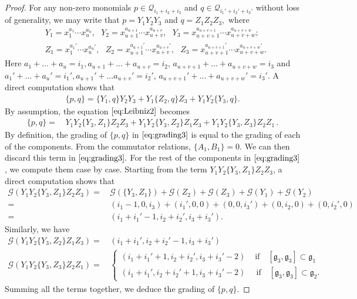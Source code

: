 \documentclass[10pt]{amsart}
\theoremstyle{definition}
\theoremstyle{corollary}
\theoremstyle{remark}
\theoremstyle{conclusion}
\begin{document}
 \begin{proof}
     For any non-zero monomials $p  \in \mathcal{Q}_{i_1 + i_2  + i_3}$ and $q \in \mathcal{Q}_{i_1' + i_2' + i_3'}$ without loss of generality, we may write that $p = Y_1Y_2Y_3$ and $q = Z_1Z_2Z_3,$ where  
        \begin{align*}
         &  Y_1 = x_1^{a_1} \cdots x_u^{a_u},    \text{ } Y_2 = x_{u+1}^{a_{u+1}} \cdots x_{u+v}^{a_{u+v}}, \text{ } Y_3 =  x_{u+v+1}^{a_{u+v+1}} \cdots x_{u+v+w}^{a_{u+v+w}} ; \\
      & Z_1 = x_1^{a_1'} \cdots x_u^{a_u'} ,\text{ } Z_2 = x_{u+1}^{a_{u+1}'} \cdots x_{u+v}^{a_{u+v}'} , \text{ }  Z_3 =  x_{u+v+1}^{a_{u+v+1}'} \cdots x_{u+v+w}^{a_{u+v+w}'}.
    \end{align*} 
    Here $a_1 + \ldots + a_u = i_1, a_{u+1} + \ldots + a_{u+v} = i_2$, $a_{u+v+1} + \ldots + a_{u+v+w} = i_3$ and $a_1' + \ldots + a_u' = i_1', a_{u+1}' + \ldots a_{u+v}' = i_2'$, $a_{u+v+1}' + \ldots + a_{u+v+w}' = i_3'.$ A direct computation shows that 
    \begin{align}
     \{p,q\} = \{Y_1,q\}Y_2Y_3 + Y_1\{Z_2,q\}Z_3 + Y_1 Y_2 \{Y_3,q\}. \label{eq:Leibniz2}
 \end{align}    
 By assumption, the equation $\eqref{eq:Leibniz2}$ becomes 
 \begin{align}
     \{p,q\}    =    & \,    Y_1Y_2 \{Y_3,Z_1\}Z_2 Z_3 +  Y_1Y_2 \{Y_3,Z_2\}Z_1 Z_3 +  Y_1Y_2 \{Y_3,Z_3\}Z_2 Z_1 \, . \label{eq:grading3}
 \end{align}   
 By definition, the grading of $\{p,q\}$ in $\eqref{eq:grading3}$ is equal to the grading of each of the components. From the commutator relations, $\{A_1,B_1\} = 0$. We can then discard this term in $\eqref{eq:grading3}.$ For the rest of the components in $\eqref{eq:grading3}$, we  compute them case by case. Starting from the term  $  Y_1Y_2 \{Y_3,Z_1\}Z_2 Z_3$, a direct computation shows that 
 \begin{align*}
     \mathcal{G} \left(  Y_1Y_2 \{Y_3,Z_1\}Z_2 Z_3\right) = & \, \mathcal{G} \left(\{Y_3,Z_1\}\right) + \mathcal{G} (Z_2) + \mathcal{G} (Z_3) + \mathcal{G} (Y_1) +\mathcal{G} (Y_2)  \\
     = & \, (i_1-1,0,i_3) + ( i_1', 0,0 ) + (0,0,i_3')+ (0,i_2,0)+ (0,i_2',0 ) \\
     = & \, (i_1 +i_1'-1,i_2 +i_2',i_3+i_3') .
 \end{align*} Similarly, we have \begin{align*}
      \mathcal{G} \left(Y_1Y_2 \{Y_3,Z_2\}Z_1 Z_3 \right) = & \, (i_1+i_1',i_2+i_2'-1,i_3+i_3')\\
       \mathcal{G} \left(Y_1Y_2 \{Y_3,Z_3\}Z_2 Z_1\right) = & \, \left\{\begin{matrix}
           ( i_1+i_1'+1,i_2+i_2',i_3+i_3'-2) &  \text{ if } \text{ }[\mathfrak{g}_3,\mathfrak{g}_3] \subset \mathfrak{g}_1 \\
           (i_1+i_1',i_2+i_2'+1,i_3+i_3'-2) & \, \text{ if } \text{ }[\mathfrak{g}_3,\mathfrak{g}_3] \subset \mathfrak{g}_2 .
       \end{matrix}\right.   
 \end{align*} 
 Summing all the terms together, we deduce the grading of $\{p,q\}.$  
 \end{proof}
\end{document}
